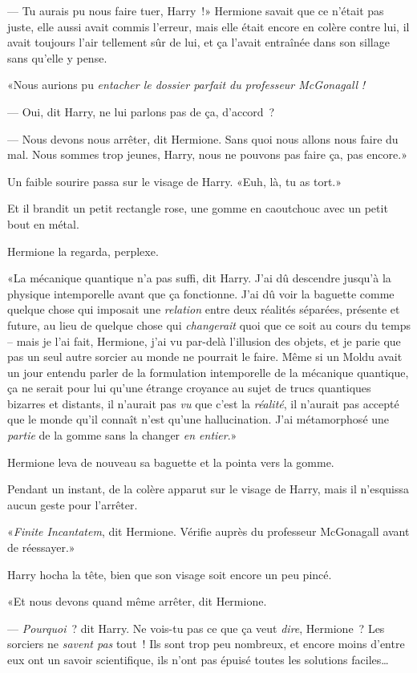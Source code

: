--- Tu aurais pu nous faire tuer, Harry~!» Hermione savait que ce n'était pas juste, elle aussi avait commis l'erreur, mais elle était encore en colère contre lui, il avait toujours l'air tellement sûr de lui, et ça l'avait entraînée dans son sillage sans qu'elle y pense.

«Nous aurions pu \emph{entacher le dossier parfait du professeur McGonagall} \emph{!}

--- Oui, dit Harry, ne lui parlons pas de ça, d'accord~?

--- Nous devons nous arrêter, dit Hermione. Sans quoi nous allons nous faire du mal. Nous sommes trop jeunes, Harry, nous ne pouvons pas faire ça, pas encore.»

Un faible sourire passa sur le visage de Harry. «Euh, là, tu as tort.»

Et il brandit un petit rectangle rose, une gomme en caoutchouc avec un petit bout en métal.

Hermione la regarda, perplexe.

«La mécanique quantique n'a pas suffi, dit Harry. J'ai dû descendre jusqu'à la physique intemporelle avant que ça fonctionne. J'ai dû voir la baguette comme quelque chose qui imposait une \emph{relation} entre deux réalités séparées, présente et future, au lieu de quelque chose qui \emph{changerait} quoi que ce soit au cours du temps -- mais je l'ai fait, Hermione, j'ai vu par-delà l'illusion des objets, et je parie que pas un seul autre sorcier au monde ne pourrait le faire. Même si un Moldu avait un jour entendu parler de la formulation intemporelle de la mécanique quantique, ça ne serait pour lui qu'une étrange croyance au sujet de trucs quantiques bizarres et distants, il n'aurait pas \emph{vu} que c'est la \emph{réalité}, il n'aurait pas accepté que le monde qu'il connaît n'est qu'une hallucination. J'ai métamorphosé une \emph{partie} de la gomme sans la changer \emph{en entier}.»

Hermione leva de nouveau sa baguette et la pointa vers la gomme.

Pendant un instant, de la colère apparut sur le visage de Harry, mais il n'esquissa aucun geste pour l'arrêter.

«\emph{Finite Incantatem}, dit Hermione. Vérifie auprès du professeur McGonagall avant de réessayer.»

Harry hocha la tête, bien que son visage soit encore un peu pincé.

«Et nous devons quand même arrêter, dit Hermione.

--- \emph{Pourquoi}~? dit Harry. Ne vois-tu pas ce que ça veut \emph{dire}, Hermione~? Les sorciers ne \emph{savent pas} tout~! Ils sont trop peu nombreux, et encore moins d'entre eux ont un savoir scientifique, ils n'ont pas épuisé toutes les solutions faciles…

